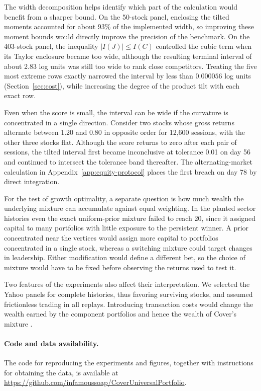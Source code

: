 \documentclass{article}
\numberwithin{equation}{section}
\theoremstyle{remark}
\begin{document}
The width decomposition helps identify which part of the calculation would
benefit from a sharper bound. On the 50-stock panel, enclosing the tilted
moments accounted for about 93\% of the implemented width, so improving
these moment bounds would directly improve the precision of the benchmark.
On the 403-stock panel, the inequality $|I(J)|\le I(C)$ controlled the cubic
term when its Taylor enclosure became too wide, although the resulting
terminal interval of about 2.83 log units was still too wide to rank close
competitors. Treating the five most extreme rows exactly narrowed the
interval by less than $0.000056$ log units (Section~\ref{sec:cost}),
while increasing the degree of the product tilt with each exact row.

Even when the score is small, the interval can be wide if the curvature
is concentrated in a single direction. Consider two stocks whose gross
returns alternate between 1.20 and 0.80 in opposite order for 12,600
sessions, with the other three stocks flat. Although the score returns to
zero after each pair of sessions, the tilted interval first became
inconclusive at tolerance 0.01 on day 56 and continued to intersect the
tolerance band thereafter. The alternating-market calculation in
Appendix~\ref{app:equity-protocol} places the first breach on day 78
by direct integration.

For the test of growth optimality, a separate question is how much wealth
the underlying mixture can accumulate against equal weighting. In the
planted sector histories even the exact uniform-prior mixture failed to
reach 20, since it assigned capital to many portfolios with little exposure
to the persistent winner. A prior concentrated near the vertices would
assign more capital to portfolios concentrated in a single stock, whereas
a switching mixture could target changes in leadership. Either modification
would define a different bet, so the choice of mixture would have to be
fixed before observing the returns used to test it.

Two features of the experiments also affect their interpretation. We
selected the Yahoo panels for complete histories, thus favoring surviving
stocks, and assumed frictionless trading in all replays. Introducing
transaction costs would change the wealth earned by the component portfolios
and hence the wealth of Cover's mixture \citep{blumkalai1999}.

\paragraph{Code and data availability.}
The code for reproducing the experiments and figures, together with
instructions for obtaining the data, is available at
\url{https://github.com/infamoussoap/CoverUniversalPortfolio}.
\end{document}
